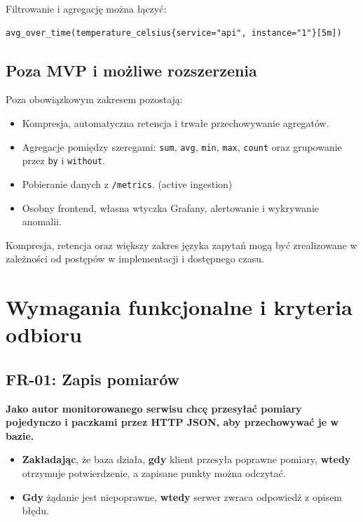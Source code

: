 \documentclass[12pt,a4paper]{article}
\begin{document}
Filtrowanie i agregację można łączyć:

\begin{verbatim}
avg_over_time(temperature_celsius{service="api", instance="1"}[5m])
\end{verbatim}

\subsection{Poza MVP i możliwe rozszerzenia}

Poza obowiązkowym zakresem pozostają:

\begin{itemize}
    \item Kompresja, automatyczna retencja i trwałe przechowywanie agregatów.
    \item Agregacje pomiędzy szeregami: \texttt{sum}, \texttt{avg}, \texttt{min}, \texttt{max}, \texttt{count} oraz grupowanie przez \texttt{by} i \texttt{without}.
    \item Pobieranie danych z \texttt{/metrics}. (active ingestion)
    \item Osobny frontend, własna wtyczka Grafany, alertowanie i wykrywanie anomalii.
\end{itemize}


Kompresja, retencja oraz większy zakres języka zapytań mogą być zrealizowane w zależności od postępów w implementacji i dostępnego czasu.

\section{Wymagania funkcjonalne i kryteria odbioru}

\subsection*{FR-01: Zapis pomiarów}

\textbf{Jako autor monitorowanego serwisu chcę przesyłać pomiary pojedynczo i paczkami przez HTTP JSON, aby przechowywać je w bazie.}

\begin{itemize}
    \item \textbf{Zakładając}, że baza działa, \textbf{gdy} klient przesyła poprawne pomiary, \textbf{wtedy} otrzymuje potwierdzenie, a zapisane punkty można odczytać.
    \item \textbf{Gdy} żądanie jest niepoprawne, \textbf{wtedy} serwer zwraca odpowiedź z opisem błędu.
\end{itemize}
\end{document}
